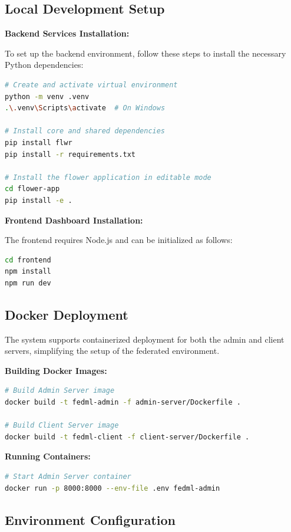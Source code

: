 \subsection{Local Development Setup}

\textbf{Backend Services Installation:}

To set up the backend environment, follow these steps to install the necessary Python dependencies:

\begin{lstlisting}[language=bash]
# Create and activate virtual environment
python -m venv .venv
.\.venv\Scripts\activate  # On Windows

# Install core and shared dependencies
pip install flwr
pip install -r requirements.txt

# Install the flower application in editable mode
cd flower-app
pip install -e .
\end{lstlisting}

\textbf{Frontend Dashboard Installation:}

The frontend requires Node.js and can be initialized as follows:

\begin{lstlisting}[language=bash]
cd frontend
npm install
npm run dev
\end{lstlisting}

\subsection{Docker Deployment}

The system supports containerized deployment for both the admin and client servers, simplifying the setup of the federated environment.

\textbf{Building Docker Images:}

\begin{lstlisting}[language=bash]
# Build Admin Server image
docker build -t fedml-admin -f admin-server/Dockerfile .

# Build Client Server image
docker build -t fedml-client -f client-server/Dockerfile .
\end{lstlisting}

\textbf{Running Containers:}

\begin{lstlisting}[language=bash]
# Start Admin Server container
docker run -p 8000:8000 --env-file .env fedml-admin
\end{lstlisting}

\subsection{Environment Configuration}

